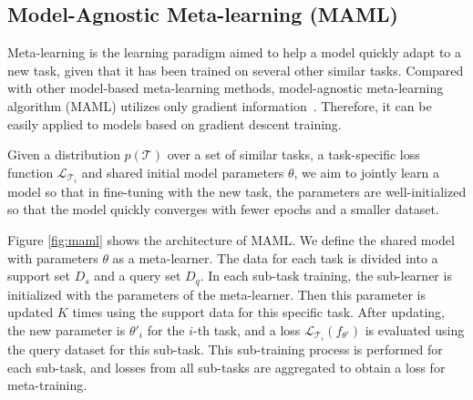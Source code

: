 %
%

\subsection*{Model-Agnostic Meta-learning (MAML)}

Meta-learning is the learning paradigm aimed to help a model quickly adapt to a new task, given that it has been trained on several other similar tasks. Compared with other model-based meta-learning methods, model-agnostic meta-learning algorithm (MAML) utilizes only gradient information~\citep{finn2017model}. Therefore, it can be easily applied to models based on gradient descent training.

Given a distribution $p(\mathcal{T})$ over a set of similar tasks, a task-specific loss function $\mathcal{L}_{\mathcal{T}_i}$ and shared initial model parameters $\theta$, we aim to jointly learn a model so that in fine-tuning with the new task, the parameters are well-initialized so that the model quickly converges with fewer epochs and a smaller dataset.

Figure \ref{fig:maml} shows the architecture of MAML. We define the shared model with parameters $\theta$ as a meta-learner. The data for each task is divided into a support set $D_s$ and a query set $D_q$. In each sub-task training, the sub-learner is initialized with the parameters of the meta-learner. Then this parameter is updated $K$ times using the support data for this specific task. After updating, the new parameter is $\theta'_i$ for the $i$-th task, and a loss $\mathcal{L}_{\mathcal{T}_i}(f_{\theta'})$ is evaluated using the query dataset for this sub-task. This sub-training process is performed for each sub-task, and losses from all sub-tasks are aggregated to obtain a loss for meta-training.

